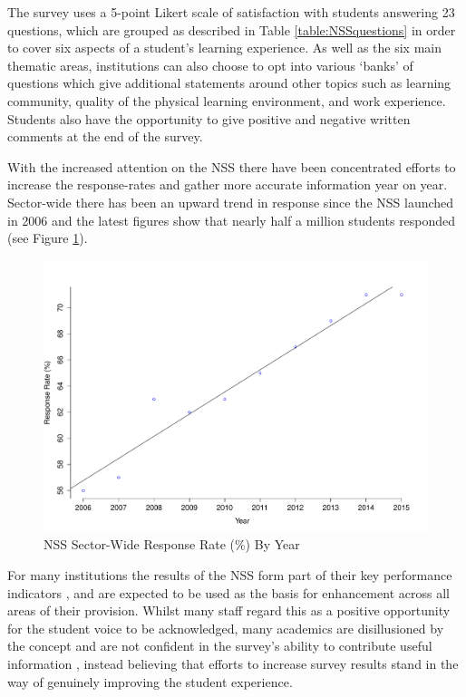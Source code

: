 \documentclass[11pt,a4paper]{report}
\begin{document}
The survey uses a 5-point Likert scale of satisfaction with students answering 23 questions, which are grouped as described in Table \ref{table:NSSquestions} in order to cover six aspects of a student's learning experience. 
As well as the six main thematic areas, institutions can also choose to opt into various `banks' of questions which give additional statements around other topics such as learning community, quality of the physical learning environment, and work experience. Students also have the opportunity to give positive and negative written comments at the end of the survey.  

With the increased attention on the \ac{NSS} there have been concentrated efforts to increase the response-rates and gather more accurate information year on year. Sector-wide there has been an upward trend in response since the \ac{NSS} launched in 2006 and the latest figures show that nearly half a million students responded (see Figure \ref{fig:responsetrend}).

\begin{figure}[H]
	\centering
	\includegraphics[scale=0.5]{images/SectorResponseRates.pdf}
	\caption{NSS Sector-Wide Response Rate (\%) By Year}
	\label{fig:responsetrend}
\end{figure}

For many institutions the results of the \ac{NSS} form part of their key performance indicators \cite{NSSpainorgain2009}, and are expected to be used as the basis for enhancement across all areas of their provision. Whilst many staff regard this as a positive opportunity for the student voice to be acknowledged, many academics are disillusioned by the concept \cite{child2011perception} and are not confident in the survey's ability to contribute useful information \cite{NSSworthless2008, AbolishNSS2015}, instead believing that efforts to increase survey results stand in the way of genuinely improving the student experience.\\ 
\end{document}
